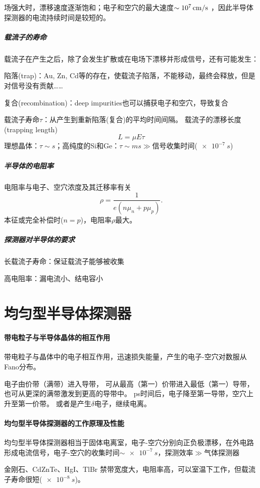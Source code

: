 场强大时，漂移速度逐渐饱和；电子和空穴的最大速度$\sim\SI{E7}{cm/s}$%
，因此半导体探测器的电流持续时间是较短的。
\subparagraph{载流子的寿命}
载流子在产生之后，除了会发生扩散或在电场下漂移并形成信号，还有可能发生：
\begin{compactitem}
	\item 陷落(trap)：Au, Zn, Cd等的存在，使载流子陷落，不能移动，最终会释放，但是对信号没有贡献……
	\item 复合(recombination)：deep impurities也可以捕获电子和空穴，导致复合%
\end{compactitem}
载流子寿命$\tau$：从产生到重新陷落(复合)的平均时间间隔。
载流子的漂移长度(trapping length)
\[
	L=\mu E\tau
\]
理想晶体：$\tau\sim\si{s}$；高纯度的Si和Ge：$\tau\sim\si{ms}\gg$信号收集时间($\SI{e-7}{s}$)
\subparagraph{半导体的电阻率}
电阻率与电子、空穴浓度及其迁移率有关
\[
	\rho=\frac1{e(n\mu_n+p\mu_p)}.
\]
本征或完全补偿时($n=p$)，电阻率$\rho$最大。
\subparagraph{探测器对半导体的要求}
\begin{compactenum}
	\item 长载流子寿命：保证载流子能够被收集
	\item 高电阻率：漏电流小、结电容小
\end{compactenum}

\section{均匀型半导体探测器}

\paragraph{带电粒子与半导体晶体的相互作用}
带电粒子与晶体中的电子相互作用，迅速损失能量，产生的电子-空穴对数服从Fano分布。

电子由价带（满带）进入导带，
可从最高（第一）价带进入最低（第一）导带，
也可从更深的满带激发到更高的导带中。
ps时间后，电子降至第一导带，空穴上升至第一价带。
或者是产生$\delta$电子，继续电离。
\paragraph{均匀型半导体探测器的工作原理及性能}
均匀型半导体探测器相当于固体电离室，电子-空穴分别向正负极漂移，在外电路形成电流信号，电子-空穴的收集时间$\sim\SI{e-7}{s}$，探测效率$\gg$气体探测器

金刚石、CdZnTe、HgI、TlBr
禁带宽度大，电阻率高，可以室温下工作，但载流子寿命很短($\SI{e-8}{s}$)。

